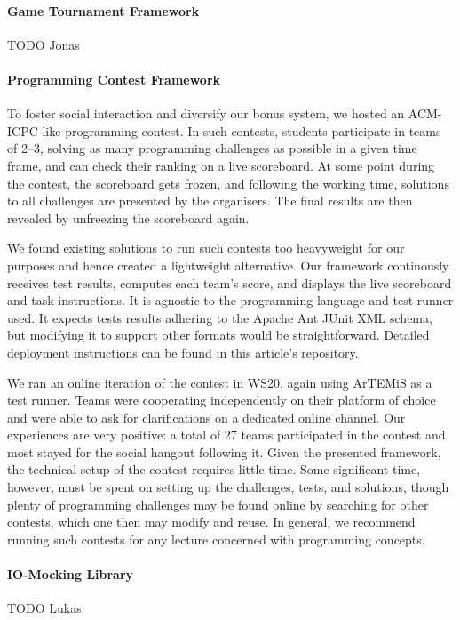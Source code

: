\paragraph{Game Tournament Framework}
TODO Jonas

\paragraph{Programming Contest Framework}\label{sec:contest}
To foster social interaction and diversify our bonus system,
we hosted an ACM-ICPC-like programming contest.
In such contests, students
participate in teams of 2--3,
solving as many programming challenges as possible in a given time frame,
and can check their ranking on a live scoreboard.
At some point during the contest,
the scoreboard gets frozen,
and following the working time,
solutions to all challenges are presented by the organisers.
The final results are then revealed by unfreezing the scoreboard again.

We found existing solutions
to run such contests too heavyweight for our purposes
and hence created a lightweight alternative.
Our framework continously receives test results,
computes each team's score,
and displays the live scoreboard and task instructions.
It is agnostic to the programming language and test runner used.
It expects tests results adhering to the Apache Ant JUnit XML schema,
but modifying it to support other formats would be straightforward.
Detailed deployment instructions can be found in this article's repository.

We ran an online iteration of the contest in WS20,
again using ArTEMiS as a test runner.
Teams were cooperating independently on their platform of choice
and were able to ask for clarifications on a dedicated online channel.
Our experiences are very positive:
a total of 27 teams participated in the contest
and most stayed for the social hangout following it.
Given the presented framework,
the technical setup of the contest requires little time.
Some significant time, however,
must be spent on setting up the challenges,
tests, and solutions,
though plenty of programming challenges may be found
online by searching for other contests,
which one then may modify and reuse.
In general, we recommend running such contests
for any lecture concerned with programming concepts.


\paragraph{IO-Mocking Library}
TODO Lukas

